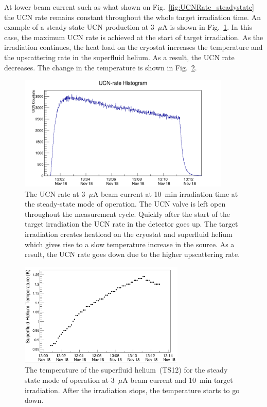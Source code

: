 At lower beam current such as what shown on
Fig.~\ref{fig:UCNRate_steadystate} the UCN rate remains constant
throughout the whole target irradiation time. An example of a
steady-state UCN production at 3~$\mu$A is shown in
Fig.~\ref{fig:UCNRate_steadystate_highbeam}. In this case, the maximum UCN rate is
achieved at the start of target irradiation. As the irradiation
continues, the heat load on the cryostat increases the temperature and
the upscattering rate in the superfluid helium. As a result, the UCN
rate decreases. The change in the temperature is shown in
Fig.~\ref{fig:UCNRate_temp}.


\begin{figure}[h!]
  \centering
  \includegraphics[width=0.9\textwidth]{654_UCNRate.png}
  \caption{The UCN rate at 3~$\mu$A beam current at 10~min irradiation
    time at the steady-state mode of operation. The UCN valve is left
    open throughout the measurement cycle. Quickly after the start of
    the target irradiation the UCN rate in the detector goes up. The
    target irradiation creates heatload on the cryostat and superfluid
    helium which gives rise to a slow temperature increase in the
    source. As a result, the UCN rate goes down due to the higher
    upscattering rate.  }
  \label{fig:UCNRate_steadystate_highbeam}
\end{figure}

\begin{figure}[h!]
  \centering
  \includegraphics[width=0.7\textwidth]{UCNRate_temp.png}
  \caption{ The temperature of the superfluid helium~(TS12) for the
    steady state mode of operation at 3~$\mu$A beam current and 10~min
    target irradiation. After the irradiation stops, the temperature
    starts to go down. }
  \label{fig:UCNRate_temp}
\end{figure}


